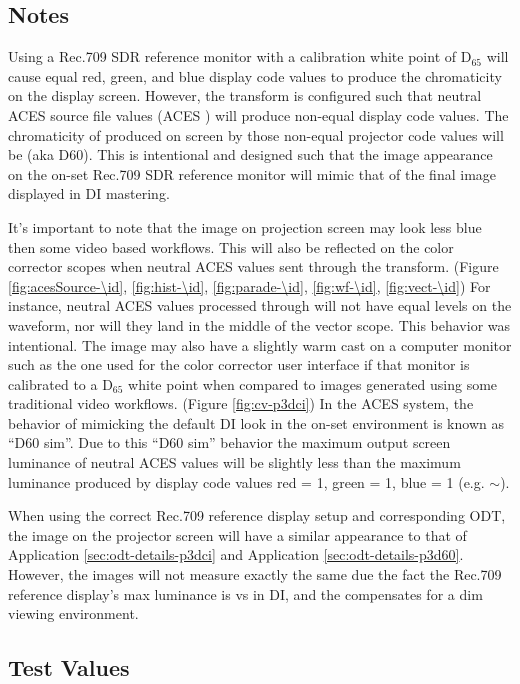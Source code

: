 \subsection{Notes}
\label{subsec:notes-\id}

Using a Rec.709 SDR reference monitor with a calibration white point of D$_{65}$ will cause equal red, green, and blue display code values to produce the chromaticity  on the display screen. However, the \transformID{\id} transform is configured such that neutral ACES source file values (ACES \rgbequal) will produce non-equal display code values. The chromaticity of produced on screen by those non-equal projector code values will be  (aka D60).  This is intentional and designed such that the image appearance on the on-set Rec.709 SDR reference monitor will mimic that of the final image displayed in DI mastering.

It's important to note that the image on projection screen may look less blue then some video based workflows. This will also be reflected on the color corrector scopes when neutral ACES values sent through the \transformID{\id} transform. (Figure \ref{fig:acesSource-\id}, \ref{fig:hist-\id}, \ref{fig:parade-\id}, \ref{fig:wf-\id}, \ref{fig:vect-\id}) For instance, neutral ACES values processed through \transformID{\id} will not have equal levels on the waveform, nor will they land in the middle of the vector scope. This behavior was intentional. The image may also have a slightly warm cast on a computer monitor such as the one used for the color corrector user interface if that monitor is calibrated to a D$_{65}$ white point when compared to images generated using some traditional video workflows. (Figure \ref{fig:cv-p3dci}) In the ACES system, the behavior of mimicking the default DI look in the on-set environment is known as ``D60 sim''. Due to this ``D60 sim'' behavior the maximum output screen luminance of neutral ACES values will be slightly less than the maximum luminance produced by display code values red = 1, green = 1, blue = 1 (e.g. $\mathtt{\sim}$).

When using the correct Rec.709 reference display setup and corresponding ODT, the image on the projector screen will have a similar appearance to that of Application \ref{sec:odt-details-p3dci} and Application \ref{sec:odt-details-p3d60}.  However, the images will not measure exactly the same due the fact the Rec.709 reference display's max luminance is  vs  in DI, and the \transformID{\id} compensates for a dim viewing environment.


\subsection{Test Values}
\label{subsec:testValues-\id}

\testValuesSubSec{}
